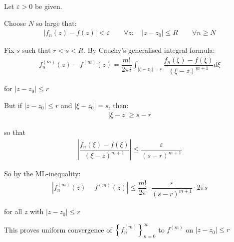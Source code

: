 \begin{prf}[]{}
  Let $\varepsilon>0$ be given.\par
  \noindent Choose $N$ so large that:
  \begin{equation*}
    \begin{gathered}
      \left|f_n(z)-f(z)\right|<\varepsilon\qquad\forall z:\quad\left|z-z_0\right|\leq R\qquad\forall n\geq N
    \end{gathered}
  \end{equation*}
  \par\bigskip
  \noindent Fix $s$ such that $r<s<R$. By Cauchy's generalised integral formula:
  \begin{equation*}
    \begin{gathered}
      f_n^{(m)}(z)-f^{(m)}(z) = \dfrac{m!}{2\pi i}\int_{\left|\xi-z_0\right| = s}\dfrac{f_n(\xi)-f(\xi)}{(\xi-z)^{m+1}}d\xi
    \end{gathered}
  \end{equation*}\par
  \noindent for $\left|z-z_0\right|\leq r$
  \par\bigskip
  \noindent But if $\left|z-z_0\right|\leq r$ and $\left|\xi-z_0\right| = s$, then:
  \begin{equation*}
    \begin{gathered}
      \left|\xi-z\right|\geq s-r
    \end{gathered}
  \end{equation*}\par
  \noindent so that
  \begin{equation*}
    \begin{gathered}
      \left|\dfrac{f_n(\xi)-f(\xi)}{(\xi-z)^{m+1}}\right|\leq \dfrac{\varepsilon}{(s-r)^{m+1}}
    \end{gathered}
  \end{equation*}
  \par\bigskip
  \noindent So by the ML-inequality:
  \begin{equation*}
    \begin{gathered}
      \left|f_n^{(m)}(z)-f^{(m)}(z)\right|\leq\dfrac{m!}{2\pi}\cdot\dfrac{\varepsilon}{(s-r)^{m+1}}\cdot2\pi s
    \end{gathered}
  \end{equation*}\par
  \noindent for all $z$ with $\left|z-z_0\right|\leq r$
  \par\bigskip
  \noindent This proves uniform convergence of $\left\{f_n^{(m)}\right\}_{n=0}^{\infty}$ to $f^{(m)}$ on $\left|z-z_0\right|\leq r$
\end{prf}
